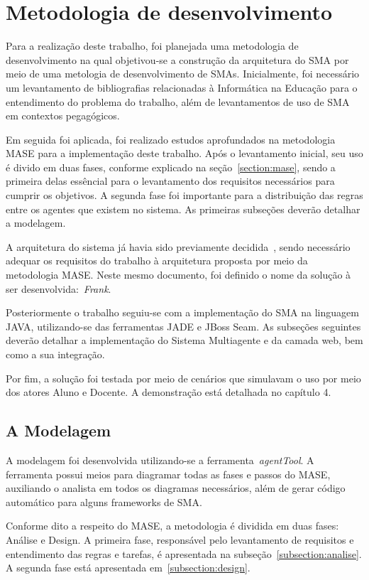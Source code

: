 \chapter{Metodologia de desenvolvimento}

Para a realização deste trabalho, foi planejada uma metodologia de desenvolvimento na qual objetivou-se a construção da arquitetura do SMA por meio de uma metologia de desenvolvimento de SMAs. Inicialmente, foi necessário um levantamento de bibliografias relacionadas à Informática na Educação para o entendimento do problema do trabalho, além de levantamentos de uso de SMA em contextos pegagógicos.

Em seguida foi aplicada, foi realizado estudos aprofundados na metodologia MASE para a implementação deste trabalho. Após o levantamento inicial, seu uso é divido em duas fases, conforme explicado na seção~\ref{section:mase}, sendo a primeira delas essêncial para o levantamento dos requisitos necessários para cumprir os objetivos. A segunda fase foi importante para a distribuição das regras entre os agentes que existem no sistema. As primeiras subseções deverão detalhar a modelagem.

A arquitetura do sistema já havia sido previamente decidida~\cite{editalFrank}, sendo necessário adequar os requisitos do trabalho à arquitetura proposta por meio da metodologia MASE. Neste mesmo documento, foi definido o nome da solução à ser desenvolvida:~\emph{Frank}.

Posteriormente o trabalho seguiu-se com a implementação do SMA na linguagem JAVA, utilizando-se das ferramentas JADE e JBoss Seam. As subseções seguintes deverão detalhar a implementação do Sistema Multiagente e da camada web, bem como a sua integração.

Por fim, a solução foi testada por meio de cenários que simulavam o uso por meio dos atores Aluno e Docente. A demonstração está detalhada no capítulo 4.

\section{A Modelagem}

A modelagem foi desenvolvida utilizando-se a ferramenta~\emph{agentTool}. A ferramenta possui meios para diagramar todas as fases e passos do MASE, auxiliando o analista em todos os diagramas necessários, além de gerar código automático para alguns frameworks de SMA.

Conforme dito a respeito do MASE, a metodologia é dividida em duas fases: Análise e Design. A primeira fase, responsável pelo levantamento de requisitos e entendimento das regras e tarefas, é apresentada na subseção~\ref{subsection:analise}. A segunda fase está apresentada em~\ref{subsection:design}.

